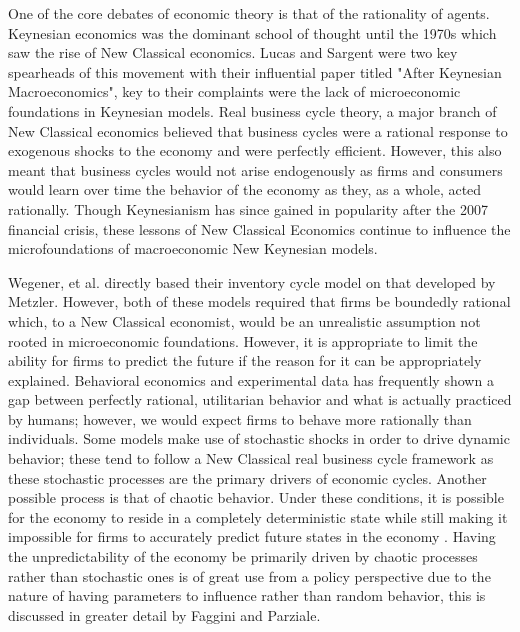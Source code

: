 One of the core debates of economic theory is that of the rationality of agents. Keynesian economics was the dominant school of thought until the 1970s which saw the rise of New Classical economics\autocite{Hartley2013}. Lucas and Sargent were two key spearheads of this movement with their influential paper titled "After Keynesian Macroeconomics", key to their complaints were the lack of microeconomic foundations in Keynesian models\autocite{Lucas1979}. Real business cycle theory, a major branch of New Classical economics believed that business cycles were a rational response to exogenous shocks to the economy and were perfectly efficient. However, this also meant that business cycles would not arise endogenously as firms and consumers would learn over time the behavior of the economy as they, as a whole, acted rationally. Though Keynesianism has since gained in popularity after the 2007 financial crisis, these lessons of New Classical Economics continue to influence the microfoundations of macroeconomic New Keynesian models.

Wegener, et al. directly based their inventory cycle model on that developed by Metzler. However, both of these models required that firms be boundedly rational which, to a New Classical economist, would be an unrealistic assumption not rooted in microeconomic foundations. However, it is appropriate to limit the ability for firms to predict the future if the reason for it can be appropriately explained. Behavioral economics and experimental data has frequently shown a gap between perfectly rational, utilitarian behavior and what is actually practiced by humans\autocite{Smith2006}; however, we would expect firms to behave more rationally than individuals. Some models make use of stochastic shocks in order to drive dynamic behavior; these tend to follow a New Classical real business cycle framework as these stochastic processes are the primary drivers of economic cycles. Another possible process is that of chaotic behavior. Under these conditions, it is possible for the economy to reside in a completely deterministic state while still making it impossible for firms to accurately predict future states in the economy . Having the unpredictability of the economy be primarily driven by chaotic processes rather than stochastic ones is of great use from a policy perspective due to the nature of having parameters to influence rather than random behavior, this is discussed in greater detail by Faggini and Parziale\autocite{Faggini2012}. 

